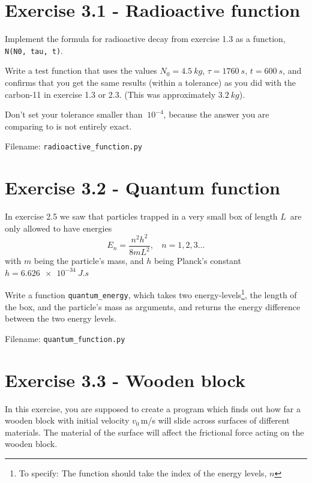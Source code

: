 \documentclass[10pt,a4paper]{article}
\begin{document}
\section*{Exercise 3.1 - Radioactive function}
Implement the formula for radioactive decay from exercise 1.3 as a function, \texttt{N(N0, tau, t)}.

Write a test function that uses the values $N_0=\SI{4.5}{kg}$, $\tau=\SI{1760}{s}$, $t=\SI{600}{s}$, and confirms that you get the same results (within a tolerance) as you did with the carbon-11 in exercise 1.3 or 2.3. (This was approximately $\SI{3.2}{kg}$).

Don't set your tolerance smaller than $~10^{-4}$, because the answer you are comparing to is not entirely exact.


Filename: \texttt{radioactive\_function.py}




\section*{Exercise 3.2 - Quantum function}

In exercise 2.5 we saw that particles trapped in a very small box of length $L$ are only allowed to have energies
\[	E_n = \frac{n^2 h^2}{8 m L^2}, \ \ \ \ n = 1,2,3\dots
\]
with $m$ being the particle's mass, and $h$ being Planck's constant $h = \SI{6.626e-34}{J.s}$

Write a function \texttt{quantum\_energy}, which takes two energy-levels\footnote{To specify: The function should take the index of the energy levels, $n$}, the length of the box, and the particle's mass as arguments, and returns the energy difference between the two energy levels.

Filename: \texttt{quantum\_function.py}



\section*{Exercise 3.3 - Wooden block}
	In this exercise, you are supposed to create a program which finds out how far a wooden block with initial velocity $v_0\,$m/s will slide across surfaces of different materials. The material of the surface will affect the frictional force acting on the wooden block. 
	
\end{document}
